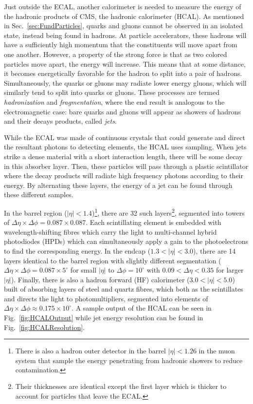 Just outside the ECAL, another calorimeter is needed to measure the energy of the hadronic products of CMS, the hadronic calorimeter (HCAL). As mentioned in Sec.~\ref{sec:FundParticles}, quarks and gluons cannot be observed in an isolated state, instead being found in hadrons. At particle accelerators, these hadrons will have a sufficiently high momentum that the constituents will move apart from one another. However, a property of the strong force is that as two colored particles move apart, the energy will increase. This means that at some distance, it becomes energetically favorable for the hadron to split into a pair of hadrons. Simultaneously, the quarks or gluons may radiate lower energy gluons, which will similarly tend to split into quarks or gluons. These processes are termed \textit{hadronization} and \textit{fragmentation}, where the end result is analogous to the electromagnetic case: bare quarks and gluons will appear as showers of hadrons and their decays products, called \textit{jets}.

While the ECAL was made of continuous crystals that could generate and direct the resultant photons to detecting elements, the HCAL uses sampling. When jets strike a dense material with a short interaction length, there will be some decay in this absorber layer. Then, these particles will pass through a plastic scintillator where the decay products will radiate high frequency photons according to their energy. By alternating these layers, the energy of a jet can be found through these different samples.

In the barrel region ($|\eta|<1.4$)\footnote{There is also a hadron outer detector in the barrel $|\eta|<1.26$ in the muon system that sample the energy penetrating from hadronic showers to reduce contamination.}, there are 32 such layers\footnote{Their thicknesses are identical except the first layer which is thicker to account for particles that leave the ECAL.}, segmented into towers of $\Delta\eta\times\Delta\phi = 0.087\times0.087$. Each scintillating element is embedded with wavelength-shifting fibres which carry the light to multi-channel hybrid photodiodes (HPDs) which can simultaneously apply a gain to the photoelectrons to find the corresponding energy. In the endcap ($1.3<|\eta|<3.0$), there are 14 layers identical to the barrel region with slightly different segmentation ($\Delta\eta\times\Delta\phi = 0.087\times5^{\circ}$ for small $|\eta|$ to $\Delta\phi=10^{\circ}$ with $0.09<\Delta\eta<0.35$ for larger $|\eta|$). Finally, there is also a hadron forward (HF) calorimeter ($3.0<|\eta|<5.0$) built of absorbing layers of steel and quartz fibres, which both as the scintillates and directs the light to photomultipliers, segmented into elements of $\Delta\eta\times\Delta\phi \approx 0.175\times10^{\circ}$. A sample output of the HCAL can be seen in Fig.~\ref{fig:HCALOutput} while jet energy resolution can be found in Fig.~\ref{fig:HCALResolution}.

